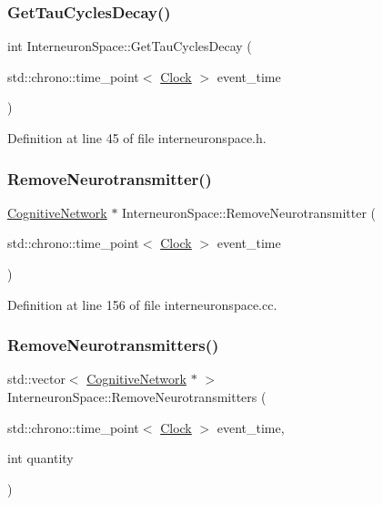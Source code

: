 \subsubsection{\texorpdfstring{Get\+Tau\+Cycles\+Decay()}{GetTauCyclesDecay()}}
{\footnotesize\ttfamily int Interneuron\+Space\+::\+Get\+Tau\+Cycles\+Decay (\begin{DoxyParamCaption}\item[{std\+::chrono\+::time\+\_\+point$<$ \mbox{\hyperlink{universe_8h_a0ef8d951d1ca5ab3cfaf7ab4c7a6fd80}{Clock}} $>$}]{event\+\_\+time }\end{DoxyParamCaption})\hspace{0.3cm}{\ttfamily [inline]}}



Definition at line 45 of file interneuronspace.\+h.

\mbox{\label{class_interneuron_space_aa46b5ce238b49425a68fcfd53ba1d8b7}} 
\subsubsection{\texorpdfstring{Remove\+Neurotransmitter()}{RemoveNeurotransmitter()}}
{\footnotesize\ttfamily \mbox{\hyperlink{class_cognitive_network}{Cognitive\+Network}} $\ast$ Interneuron\+Space\+::\+Remove\+Neurotransmitter (\begin{DoxyParamCaption}\item[{std\+::chrono\+::time\+\_\+point$<$ \mbox{\hyperlink{universe_8h_a0ef8d951d1ca5ab3cfaf7ab4c7a6fd80}{Clock}} $>$}]{event\+\_\+time }\end{DoxyParamCaption})}



Definition at line 156 of file interneuronspace.\+cc.

\mbox{\label{class_interneuron_space_a7b11f542ab7a3d293d5fcf5a1b522ac2}} 
\subsubsection{\texorpdfstring{Remove\+Neurotransmitters()}{RemoveNeurotransmitters()}}
{\footnotesize\ttfamily std\+::vector$<$ \mbox{\hyperlink{class_cognitive_network}{Cognitive\+Network}} $\ast$ $>$ Interneuron\+Space\+::\+Remove\+Neurotransmitters (\begin{DoxyParamCaption}\item[{std\+::chrono\+::time\+\_\+point$<$ \mbox{\hyperlink{universe_8h_a0ef8d951d1ca5ab3cfaf7ab4c7a6fd80}{Clock}} $>$}]{event\+\_\+time,  }\item[{int}]{quantity }\end{DoxyParamCaption})}



